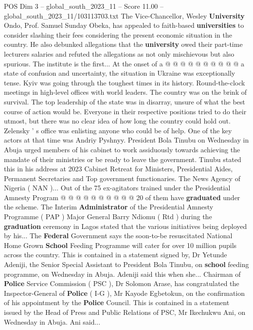 \begin{textsample}{POS Dim 3 – global\_south\_2023\_11 – Score 11.00 – global\_south\_2023\_11/103113703.txt}
The Vice-Chancellor, Wesley \textbf{University} Ondo, Prof.
Samuel Sunday Obeka, has appealed to faith-based \textbf{universities} to consider slashing their fees considering the present economic situation in the country.
He also debunked allegations that the \textbf{university} owed their part-time lecturers salaries and refuted the allegations as not only mischievous but also spurious.
The institute is the first...
At the onset of a @ @ @ @ @ @ @ @ @ @ a state of confusion and uncertainty, the situation in Ukraine was exceptionally tense.
Kyiv was going through the toughest times in its history.
Round-the-clock meetings in high-level offices with world leaders.
The country was on the brink of survival.
The top leadership of the state was in disarray, unsure of what the best course of action would be.
Everyone in their respective positions tried to do their utmost, but there was no clear idea of how long the country could hold out.
Zelensky ' s office was enlisting anyone who could be of help.
One of the key actors at that time was Andriy Pyshnyy.
President Bola Tinubu on Wednesday in Abuja urged members of his cabinet to work assiduously towards achieving the mandate of their ministries or be ready to leave the government.
Tinubu stated this in his address at 2023 Cabinet Retreat for Ministers, Presidential Aides, Permanent Secretaries and Top government functionaries.
The News Agency of Nigeria ( NAN )...
Out of the 75 ex-agitators trained under the Presidential Amnesty Program @ @ @ @ @ @ @ @ @ @ 20 of them have \textbf{graduated} under the scheme.
The Interim \textbf{Administrator} of the Presidential Amnesty Programme ( PAP ) Major General Barry Ndiomu ( Rtd ) during the \textbf{graduation} ceremony in Lagos stated that the various initiatives being deployed by his...
The \textbf{Federal} Government says the soon-to-be resuscitated National Home Grown \textbf{School} Feeding Programme will cater for over 10 million pupils across the country.
This is contained in a statement signed by, Dr Yetunde Adeniji, the Senior Special Assistant to President Bola Tinubu, on \textbf{school} feeding programme, on Wednesday in Abuja.
Adeniji said this when she...
Chairman of \textbf{Police} Service Commission ( PSC ), Dr Solomon Arase, has congratulated the Inspector-General of \textbf{Police} ( I-G ), Mr Kayode Egbetokun, on the confirmation of his appointment by the \textbf{Police} Council.
This is contained in a statement issued by the Head of Press and Public Relations of PSC, Mr Ikechukwu Ani, on Wednesday in Abuja.
Ani said...

\end{textsample}
